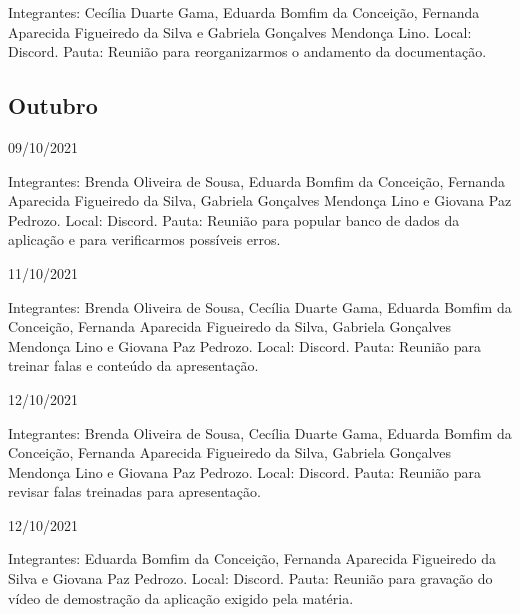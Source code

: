 \begin{apendicesenv}
\begin{flushleft}
Integrantes: Cecília Duarte Gama, Eduarda Bomfim da Conceição, Fernanda Aparecida Figueiredo da Silva e Gabriela Gonçalves Mendonça Lino.
\newline
Local: \gls{Discord}.
\newline
Pauta: Reunião para reorganizarmos o andamento da documentação.
\end{flushleft}

\begin{flushleft}
\section{Outubro}

09/10/2021 

Integrantes: Brenda Oliveira de Sousa, Eduarda Bomfim da Conceição, Fernanda Aparecida Figueiredo da Silva, Gabriela Gonçalves Mendonça Lino e Giovana Paz Pedrozo.
\newline
Local: \gls{Discord}.
\newline
Pauta: Reunião para popular banco de dados da aplicação e para verificarmos possíveis erros.

11/10/2021 

Integrantes: Brenda Oliveira de Sousa, Cecília Duarte Gama, Eduarda Bomfim da Conceição, Fernanda Aparecida Figueiredo da Silva, Gabriela Gonçalves Mendonça Lino e Giovana Paz Pedrozo.
\newline
Local: \gls{Discord}.
\newline
Pauta: Reunião para treinar falas e conteúdo da apresentação.

12/10/2021 

Integrantes: Brenda Oliveira de Sousa, Cecília Duarte Gama, Eduarda Bomfim da Conceição, Fernanda Aparecida Figueiredo da Silva, Gabriela Gonçalves Mendonça Lino e Giovana Paz Pedrozo.
\newline
Local: \gls{Discord}.
\newline
Pauta: Reunião para revisar falas treinadas para apresentação.

12/10/2021 

Integrantes: Eduarda Bomfim da Conceição, Fernanda Aparecida Figueiredo da Silva e Giovana Paz Pedrozo.
\newline
Local: \gls{Discord}.
\newline
Pauta: Reunião para gravação do vídeo de demostração da aplicação exigido pela matéria.
\end{flushleft}




\end{apendicesenv}
